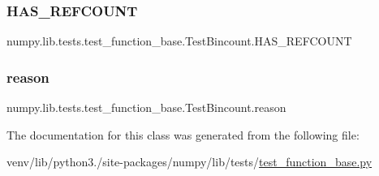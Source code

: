 \subsubsection{\texorpdfstring{H\+A\+S\+\_\+\+R\+E\+F\+C\+O\+U\+NT}{HAS\_REFCOUNT}}
{\footnotesize\ttfamily numpy.\+lib.\+tests.\+test\+\_\+function\+\_\+base.\+Test\+Bincount.\+H\+A\+S\+\_\+\+R\+E\+F\+C\+O\+U\+NT\hspace{0.3cm}{\ttfamily [static]}}

\mbox{\label{classnumpy_1_1lib_1_1tests_1_1test__function__base_1_1TestBincount_ab6e207bbd2dc8f319afc81578f1a6f55}} 
\subsubsection{\texorpdfstring{reason}{reason}}
{\footnotesize\ttfamily numpy.\+lib.\+tests.\+test\+\_\+function\+\_\+base.\+Test\+Bincount.\+reason\hspace{0.3cm}{\ttfamily [static]}}



The documentation for this class was generated from the following file\+:\begin{DoxyCompactItemize}
\item 
venv/lib/python3./site-\/packages/numpy/lib/tests/\hyperlink{lib_2tests_2test__function__base_8py}{test\+\_\+function\+\_\+base.\+py}\end{DoxyCompactItemize}
